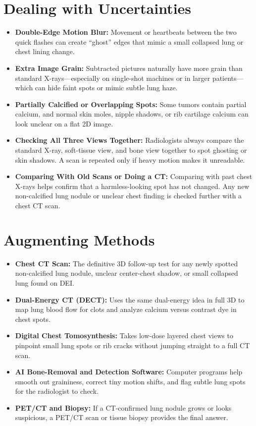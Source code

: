 \section{Dealing with Uncertainties}
\begin{itemize}
    \item \textbf{Double-Edge Motion Blur:} Movement or heartbeats between the two quick flashes can create ``ghost'' edges that mimic a small collapsed lung or chest lining change.
    \item \textbf{Extra Image Grain:} Subtracted pictures naturally have more grain than standard X-rays---especially on single-shot machines or in larger patients---which can hide faint spots or mimic subtle lung haze.
    \item \textbf{Partially Calcified or Overlapping Spots:} Some tumors contain partial calcium, and normal skin moles, nipple shadows, or rib cartilage calcium can look unclear on a flat 2D image.
    \item \textbf{Checking All Three Views Together:} Radiologists always compare the standard X-ray, soft-tissue view, and bone view together to spot ghosting or skin shadows. A scan is repeated only if heavy motion makes it unreadable.
    \item \textbf{Comparing With Old Scans or Doing a CT:} Comparing with past chest X-rays helps confirm that a harmless-looking spot has not changed. Any new non-calcified lung nodule or unclear chest finding is checked further with a chest CT scan.
\end{itemize}

\section{Augmenting Methods}
\begin{itemize}
    \item \textbf{Chest CT Scan:} The definitive 3D follow-up test for any newly spotted non-calcified lung nodule, unclear center-chest shadow, or small collapsed lung found on DEI.
    \item \textbf{Dual-Energy CT (DECT):} Uses the same dual-energy idea in full 3D to map lung blood flow for clots and analyze calcium versus contrast dye in chest spots.
    \item \textbf{Digital Chest Tomosynthesis:} Takes low-dose layered chest views to pinpoint small lung spots or rib cracks without jumping straight to a full CT scan.
    \item \textbf{AI Bone-Removal and Detection Software:} Computer programs help smooth out graininess, correct tiny motion shifts, and flag subtle lung spots for the radiologist to check.
    \item \textbf{PET/CT and Biopsy:} If a CT-confirmed lung nodule grows or looks suspicious, a PET/CT scan or tissue biopsy provides the final answer.
\end{itemize}


